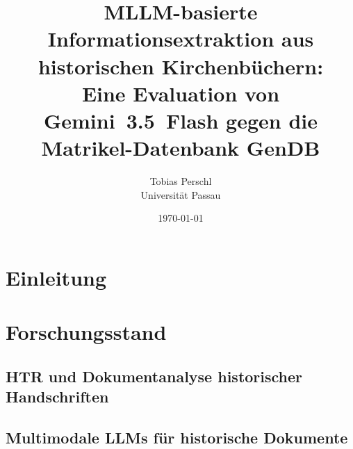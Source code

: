 \documentclass[11pt,a4paper]{article}
\title{MLLM-basierte Informationsextraktion aus historischen Kirchenbüchern:\\
Eine Evaluation von Gemini~3.5~Flash gegen die Matrikel-Datenbank GenDB}
\author{Tobias Perschl\\Universität Passau}
\date{\today}
\begin{document}
\maketitle

\begin{abstract}
\end{abstract}

\section{Einleitung}

\section{Forschungsstand}
\subsection{HTR und Dokumentanalyse historischer Handschriften}
\subsection{Multimodale LLMs für historische Dokumente}
\end{document}
